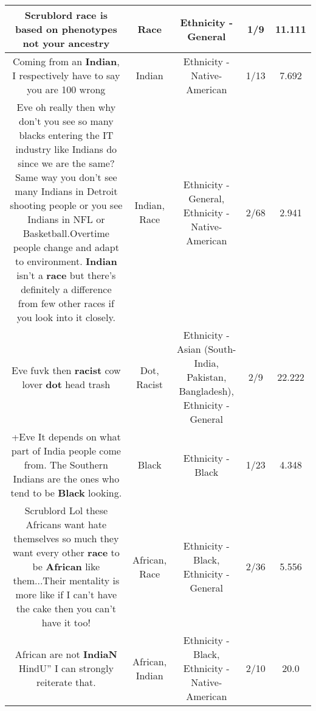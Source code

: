 \documentclass[11pt]{article}
\newlength\mylength
\begin{document}
\begin{center}
\begin{longtable}{|C{.65\mylength}|C{.30\mylength}|C{.12\mylength}|C{.12\mylength}|C{.12\mylength}|}
  \small Scrublord \textbf{race} is based on phenotypes not your ancestry\normalsize   & Race & Ethnicity - General & 1/9 & 11.111 \\  \hline
  \small Coming from an \textbf{Indian}, I respectively have to say you are 100 wrong\normalsize   & Indian & Ethnicity - Native-American & 1/13 & 7.692 \\  \hline
  \small Eve oh really then why don't you see so many blacks entering the IT industry like Indians do since we are the same? Same way you don't see many Indians in Detroit shooting people or you see Indians in NFL or Basketball.Overtime people change and adapt to environment. \textbf{Indian} isn't a \textbf{race} but there's definitely a difference from few other races if you look into it closely.\normalsize   & Indian, Race & Ethnicity - General, Ethnicity - Native-American & 2/68 & 2.941 \\  \hline
  \small Eve fuvk then \textbf{racist} cow lover \textbf{dot} head trash\normalsize   & Dot, Racist & Ethnicity - Asian (South- India, Pakistan, Bangladesh), Ethnicity - General & 2/9 & 22.222 \\  \hline
  \small +Eve It depends on what part of India people come from. The Southern Indians are the ones who tend to be \textbf{Black} looking.\normalsize   & Black & Ethnicity - Black & 1/23 & 4.348 \\  \hline
  \small Scrublord Lol these Africans want hate themselves so much they want every other \textbf{race} to be \textbf{African} like them...Their mentality is more like if I can't have the cake then you can't have it too!\normalsize   & African, Race & Ethnicity - Black, Ethnicity - General & 2/36 & 5.556 \\  \hline
  \small African are not \textbf{IndiaN} HindU'' I can strongly reiterate that.\normalsize   & African, Indian & Ethnicity - Black, Ethnicity - Native-American & 2/10 & 20.0 \\  \hline

\end{longtable}
\end{center}
\end{document}
